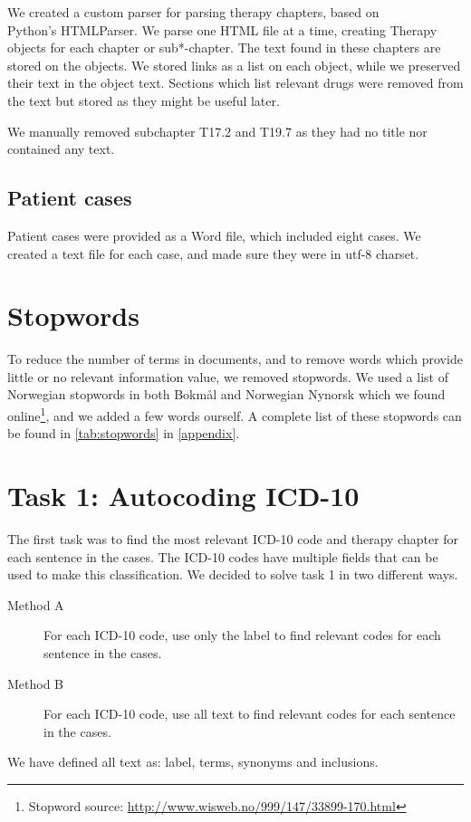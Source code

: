 We created a custom parser for parsing therapy chapters, based on\\
Python's HTMLParser. We parse one HTML file at a time, creating Therapy
objects for each chapter or sub*-chapter. The text found in these chapters are
stored on the objects. We stored links as a list on each object, while we
preserved their text in the object text. Sections which list relevant drugs
were removed from the text but stored as they might be useful later.

We manually removed subchapter T17.2 and T19.7 as they had no title nor
contained any text.

\subsection{Patient cases}
Patient cases were provided as a Word file, which included eight cases. We
created a text file for each case, and made sure they were in utf-8 charset.


\section{Stopwords}
To reduce the number of terms in documents, and to remove words which provide
little or no relevant information value, we removed stopwords.
We used a list of Norwegian stopwords in both Bokmål and Norwegian Nynorsk
which we found
online\footnote{Stopword source: \url{http://www.wisweb.no/999/147/33899-170.html}},
and we added a few words ourself. A complete list of these stopwords can
be found in \autoref{tab:stopwords} in \autoref{appendix}.


\section{Task 1: Autocoding ICD-10}
\label{sec:task1}
The first task was to find the most relevant ICD-10 code and therapy chapter for each sentence in the cases. The ICD-10 codes have multiple fields that can be used to make this classification. We decided to solve task 1 in two different ways.
\begin{description}
	\item[Method A] For each ICD-10 code, use only the label to find relevant codes for each sentence in the cases. 
	\item[Method B] For each ICD-10 code, use all text to find relevant codes for each sentence in the cases.
\end{description}
We have defined all text as: label, terms, synonyms and inclusions.

